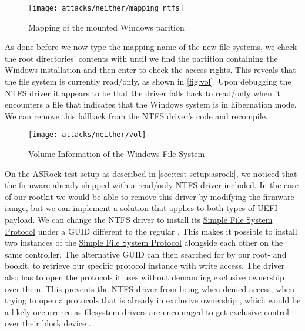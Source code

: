 \begin{figure}[htb]
    \centering
    \texttt{[image: attacks/neither/mapping\_ntfs]}
    \caption{Mapping of the mounted Windows parition}
    \label{fig:mapping-ntfs}
\end{figure}

As done before we now type the mapping name of the new file systems, we check the root directories' contents with  until we find the partition containing the Windows installation and then enter  to check the access rights.
This reveals that the file system is currently read\-/only, as shown in \autoref{fig:vol}.
Upon debugging the \ac{NTFS} driver it appears to be that the driver falls back to read\-/only when it encounters a file that indicates that the Windows system is in hibernation mode.
We can remove this fallback from the \ac{NTFS} driver's code and recompile.

\begin{figure}[htb]
    \centering
    \texttt{[image: attacks/neither/vol]}
    \caption{Volume Information of the Windows File System}
    \label{fig:vol}
\end{figure}

On the ASRock test setup as described in \autoref{sec:test-setup:asrock}, we noticed that the firmware already shipped with a read\-/only \ac{NTFS} driver included.
In the case of our rootkit we would be able to remove this driver by modifying the firmware iamge, but we can implement a solution that applies to both types of \ac{UEFI} payload.
We can change the \ac{NTFS} driver to install its \hyperref[lst:simple-file-system-protocol]{Simple File System Protocol} under a \ac{GUID} different to the regular .
This makes it possible to install two instances of the \hyperref[lst:simple-file-system-protocol]{Simple File System Protocol} alongside each other on the same controller.
The alternative \ac{GUID} can then searched for by our root- and bookit, to retrieve our specific protocol instance with write access.
The driver also has to open the protocols it uses without demanding exclusive ownership over them.
This prevents the \ac{NTFS} driver from being when denied access, when trying to open a protocols that is already in exclusive ownership \cite[Section 7.3]{uefi-spec}, which would be a likely occurrence as filesystem drivers are encouraged to get exclusive control over their block device \cite[Section 13.5]{uefi-spec}.

